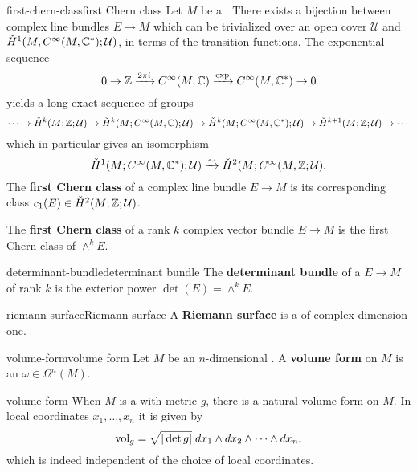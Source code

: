 \begin{topic}{first-chern-class}{first Chern class}
    Let $M$ be a . There exists a bijection between complex line bundles $E \to M$ which can be trivialized over an open cover $\mathcal{U}$ and $\check{H}^1(M, C^\infty(M, \mathbb{C}^*); \mathcal{U})$, in terms of the transition functions. The exponential sequence
    \[ 0 \to \mathbb{Z} \xrightarrow{2 \pi i} C^\infty(M, \mathbb{C}) \xrightarrow{\exp} C^\infty(M, \mathbb{C}^*) \to 0 \]
    yields a long exact sequence of  groups
    \[ \cdots \to \check{H}^k(M; \mathbb{Z}; \mathcal{U}) \to \check{H}^k(M; C^\infty(M, \mathbb{C}); \mathcal{U}) \to \check{H}^k(M; C^\infty(M, \mathbb{C}^*); \mathcal{U}) \to \check{H}^{k + 1}(M; \mathbb{Z}; \mathcal{U}) \to \cdots \]
    which in particular gives an isomorphism
    \[ \check{H}^1(M; C^\infty(M, \mathbb{C}^*); \mathcal{U}) \xrightarrow{\sim} \check{H}^2(M; C^\infty(M, \mathbb{Z}; \mathcal{U}) . \]
    The \textbf{first Chern class} of a complex line bundle $E \to M$ is its corresponding class $c_1(E) \in \check{H}^2(M; \mathbb{Z}; \mathcal{U})$.
    
    The \textbf{first Chern class} of a rank $k$ complex vector bundle $E \to M$ is the first Chern class of $\wedge^k E$.
\end{topic}

\begin{topic}{determinant-bundle}{determinant bundle}
    The \textbf{determinant bundle} of a  $E \to M$ of rank $k$ is the exterior power $\det(E) = \wedge^k E$.
\end{topic}

\begin{topic}{riemann-surface}{Riemann surface}
    A \textbf{Riemann surface} is a   of complex dimension one.
\end{topic}

\begin{topic}{volume-form}{volume form}
    Let $M$ be an $n$-dimensional . A \textbf{volume form} on $M$ is an  $\omega \in \Omega^n(M)$.
\end{topic}

\begin{example}{volume-form}
    When $M$ is a  with metric $g$, there is a natural volume form on $M$. In local coordinates $x_1, \ldots, x_n$ it is given by
    \[ \textup{vol}_g = \sqrt{|\det g|} \; dx_1 \wedge dx_2 \wedge \cdots \wedge dx_n , \]
    which is indeed independent of the choice of local coordinates.
\end{example}

